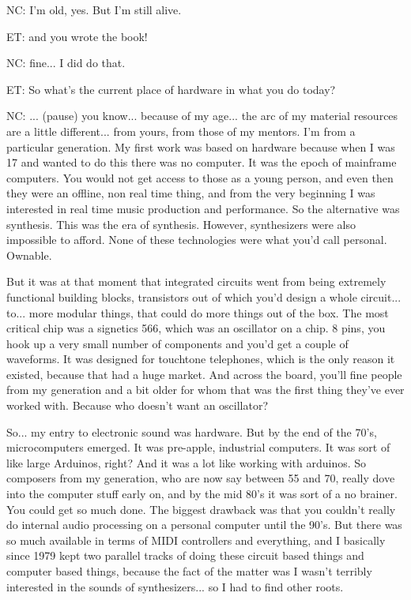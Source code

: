 NC: I'm old, yes. But I'm still alive. 

ET: and you wrote the book! 

NC: fine... I did do that. 

ET: So what's the current place of hardware in what you do today? 

NC: ... (pause) you know... because of my age... the arc of my material resources are a little different... from yours, from those of my mentors. I'm from a particular generation. My first work was based on hardware because when I was 17 and wanted to do this there was no computer. It was the epoch of mainframe computers. You would not get access to those as a young person, and even then they were an offline, non real time thing, and from the very beginning I was interested in real time music production and performance. So the alternative was synthesis. This was the era of synthesis. However, synthesizers were also impossible to afford. None of these technologies were what you'd call personal. Ownable. 

But it was at that moment that integrated circuits went from being extremely functional building blocks, transistors out of which you'd design a whole circuit... to... more modular things, that could do more things out of the box. The most critical chip was a signetics 566, which was an oscillator on a chip. 8 pins, you hook up a very small number of components and you'd get a couple of waveforms. It was designed for touchtone telephones, which is the only reason it existed, because that had a huge market. And across the board, you'll fine people from my generation and a bit older for whom that was the first thing they've ever worked with. Because who doesn't want an oscillator? 

So... my entry to electronic sound was hardware. But by the end of the 70's, microcomputers emerged. It was pre-apple, industrial computers. It was sort of like large Arduinos, right? And it was a lot like working with arduinos. So composers from my generation, who are now say between 55 and 70, really dove into the computer stuff early on, and by the mid 80's it was sort of a no brainer. You could get so much done. The biggest drawback was that you couldn't really do internal audio processing on a personal computer until the 90's. But there was so much available in terms of MIDI controllers and everything, and I basically since 1979 kept two parallel tracks of doing these circuit based things and computer based things, because the fact of the matter was I wasn't terribly interested in the sounds of synthesizers... so I had to find other roots. 

